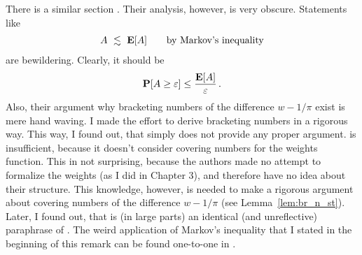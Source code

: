 \begin{remark}
  There is a similar section \cite[page 27-28]{Wang2019}.
  Their analysis, however, is very obscure. Statements like
  \begin{align*}
    A\ \lesssim\  \mathbf{E}[A] \qquad
    \text{by Markov's inequality}
  \end{align*}
  are bewildering. Clearly, it should be
  \begin{align*}
    \mathbf{P}[A\ge \varepsilon]\le \frac
    {\mathbf{E}[A]}
    {\varepsilon}
    \,.
  \end{align*}
  Also, their argument why bracketing numbers of the difference $w-1/\pi$ exist is mere hand waving. 
  I made the effort to derive bracketing numbers in a rigorous way. This way, I found out, that \cite{Wang2019} simply does not provide any proper argument. \cite[Assumption~2.4]{Wang2019} is insufficient, because it doesn't consider covering numbers for the weights function.
  This in not surprising, because the authors made no attempt to formalize the weights (as I did in Chapter 3), and therefore have no idea about their structure. 
  This knowledge, however, is needed to make a rigorous argument about covering numbers of the difference $w-1/\pi$ (see Lemma~\ref{lem:br_n_st}).
  Later, I found out, that \cite[Proof of Theorem~3]{Wang2019} is (in large parts) an identical (and unreflective) paraphrase of \cite{Fan2021}. The weird application of Markov's inequality that I stated in the beginning of this remark can be found one-to-one in \cite[page~46]{Fan}.
\end{remark}


